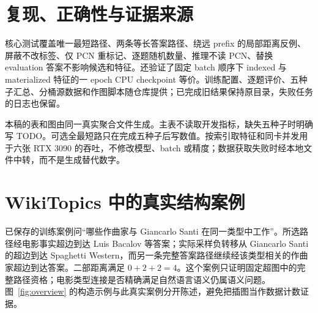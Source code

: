 \documentclass[UTF8,a4paper,10pt,fontset=fandol]{ctexart}
\begin{document}
\appendix
\section{复现、正确性与证据来源}
核心测试覆盖唯一最短路径、两条等长答案路径、绕远 prefix 的局部距离反例、屏蔽不改标签、仅 PCN 重标记、逐题随机数量、推理不读 PCN、替换 evaluation 答案不影响候选和特征。还验证了固定 batch 顺序下 indexed 与 materialized 特征的一 epoch CPU checkpoint 等价。训练配置、逐题评价、五种子汇总、分桶源数据和作图脚本随仓库提供；已完成旧结果保持原目录，失败任务的日志也保留。

本稿的表和图由同一真实聚合文件生成。主表不读取开发指标，缺失五种子时明确写 TODO。可选全最短路只在完成五种子后写数值。按索引取特征和同卡并发用于六张 RTX 3090 的吞吐，不修改模型、batch 或精度；数据获取失败时经本地文件中转，而不是生成替代数字。

\section{WikiTopics 中的真实结构案例}
已保存的训练案例问“哪些作曲家与 Giancarlo Santi 在同一类型中工作”。所选路径经电影事实超边到达 Luis Bacalov 等答案；实际采样负转移从 Giancarlo Santi 的超边到达 Spaghetti Western，而另一条完整答案路径继续经该类型相关的作曲家超边到达答案。二部距离满足 $0+2+2=4$。这个案例只证明固定超图中的完整路径资格；电影类型连接是否精确满足自然语言语义仍属语义问题。图~\ref{fig:overview} 的构造示例与此真实案例分开陈述，避免把插图当作数据计数证据。
\end{document}
